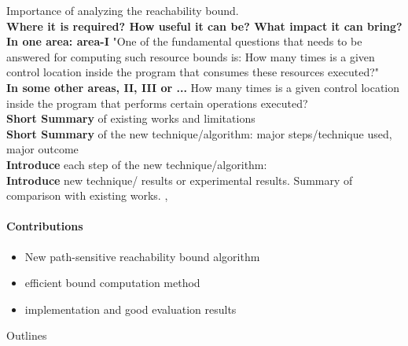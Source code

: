 Importance of analyzing the reachability bound.
\\
\textbf{Where it is required? How useful it can be? What impact it can bring?}
\\
\textbf{In one area: area-I}
"One of the fundamental questions that needs to be answered for computing such resource bounds is: 
How many times is a given control location inside the program that consumes these resources executed?"
\\
\textbf{In some other areas, II, III or ...}
How many times is a given control location inside the program that performs certain operations executed?
\\
\textbf{Short Summary} of existing works and limitations
\\
\textbf{Short Summary} of the new technique/algorithm: major steps/technique used,  major outcome
\\
\textbf{Introduce} each step of the new technique/algorithm:
\\
\textbf{Introduce} new technique/ results or experimental results. 
Summary of comparison with existing works. \cite{GulwaniJK09} \cite{Sumit2010rechability}, \cite{sinn2017complexity}
\\
\paragraph{Contributions}
\begin{itemize}
  \item New path-sensitive reachability bound algorithm
  \item efficient bound computation method \cite{GulwaniJK09} 
  \item implementation and good evaluation results
\end{itemize}
Outlines